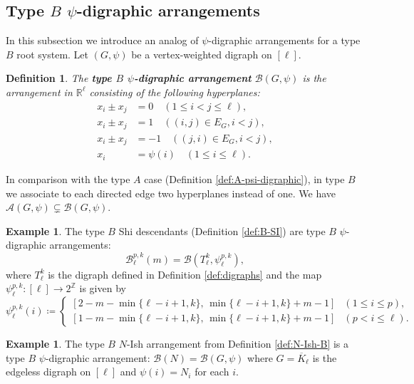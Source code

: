 \documentclass[11pt]{article}
\newtheorem{definition}[theo]{Definition}
\theoremstyle{definition}
\newtheorem{example}[theo]{Example}
\numberwithin{equation}{section}
\newcommand{\A}{\mathcal{A}}
\newcommand{\B}{\mathcal{B}}
\begin{document}
\subsection{Type \texorpdfstring{$B$}{B} \texorpdfstring{$\psi$}{psi}-digraphic arrangements}
\label{subsec:BDA}
In this subsection we introduce an analog of $ \psi $-digraphic arrangements for a type $B$ root system. 
Let $(G,\psi)$ be a vertex-weighted digraph on $ [\ell] $. 
\begin{definition}
The  \textbf{type $B$  $ \psi $-digraphic arrangement} $ \B(G,\psi) $ is the arrangement  in $ \mathbb{R}^{\ell} $
consisting of the following hyperplanes:
\begin{align*}
x_{i}\pm x_{j} &= 0\quad  (1 \leq i < j \leq \ell), \\
x_{i}\pm x_{j} &= 1\quad  ((i,j) \in E_{G}, i<j), \\
x_{i}\pm x_{j} &= -1\quad  ((j,i) \in E_{G}, i<j), \\
x_i&=  \psi(i)\quad (1 \le  i \leq \ell).
\end{align*}
\end{definition}

In comparison with the type $A$ case (Definition \ref{def:A-psi-digraphic}), in type $B$ we associate to each directed edge two hyperplanes instead of one. We have $\A(G,\psi) \subsetneq \B(G,\psi)$.



\begin{example}
\label{ex:BSI-pda}
The type $B$ Shi descendants (Definition \ref{def:B-SI}) are type $B$ $ \psi $-digraphic arrangements:
 $$\B^{p,k}_\ell(m)= \mathcal{B}(T_{\ell}^{k}, \psi_{\ell}^{p,k}),$$
where $ T_{\ell}^{k}$ is the digraph defined in Definition \ref{def:digraphs} and the map $ \psi_{\ell}^{p,k} \colon [\ell] \to 2^{\mathbb{Z}} $ is given by 
$$
 \psi_{\ell}^{p,k}(i)   \coloneqq \begin{cases}
 [2-m-\min\{\ell-i+1, k\},\,\min\{\ell-i+1, k\}+m-1] & (1 \leq   i \leq p), \\
 [1-m-\min\{\ell-i+1, k\},\,\min\{\ell-i+1, k\}+m-1] & (p<  i \leq \ell). 
\end{cases}
$$
\end{example}


\begin{example}
\label{ex:BN-Ish}
The type $B$ $N$-Ish arrangement from Definition \ref{def:N-Ish-B} is a type $B$ $ \psi $-digraphic arrangement:
$\B(N) = \B(G,\psi)$ where $G =  \overline{K}_{\ell}$ is the edgeless digraph on $ [\ell]$ and $\psi(i) =N_i$ for each $i$.
\end{example}
\end{document}

